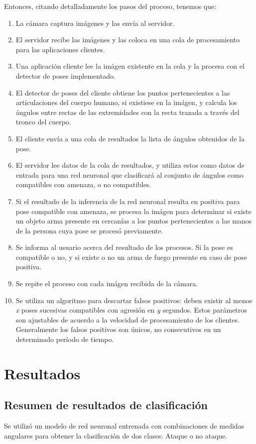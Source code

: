 \documentclass[a4paper,12pt,oneside,spanish]{book}
\begin{document}
Entonces, citando detalladamente los pasos del proceso, tenemos que:
\begin{enumerate}
	\item La cámara captura imágenes y las envía al servidor.
	\item El servidor recibe las imágenes y las coloca en una cola de procesamiento para las aplicaciones clientes.
	\item Una aplicación cliente lee la imágen existente en la cola y la procesa con el detector de poses implementado.
	\item El detector de poses del cliente obtiene los puntos pertenecientes a las articulaciones del cuerpo humano, si existiese en la imágen, y calcula los ángulos entre rectas de las extremidades con la recta trazada a través del tronco del cuerpo.
	\item El cliente envía a una cola de resultados la lista de ángulos obtenidos de la pose.
	\item El servidor lee datos de la cola de resultados, y utiliza estos como datos de entrada para una red neuronal que clasificará al conjunto de ángulos como compatibles con amenaza, o no compatibles.
	\item Si el resultado de la inferencia de la red neuronal resulta en positiva para pose compatible con amenaza, se procesa la imágen para determinar si existe un objeto arma presente en cercanías a los puntos pertenecientes a las manos de la persona cuya pose se procesó previamente.
	\item Se informa al usuario acerca del resultado de los procesos. Si la pose es compatible o no, y si existe o no un arma de fuego presente en caso de pose positiva.
	\item Se repite el proceso con cada imágen recibida de la cámara.
	\item Se utiliza un algoritmo para descartar falsos positivos: deben existir al menos \textit{x} poses sucesivas compatibles con agresión en \textit{y} segundos. Estos parámetros son ajustables de acuerdo a la velocidad de procesamiento de los clientes. Generalmente los falsos positivos son únicos, no consecutivos en un determinado período de tiempo.
\end{enumerate}\par

\newpage
\chapter{Resultados}
\section{Resumen de resultados de clasificación}\label{results1}
Se utilizó un modelo de red neuronal entrenada con combinaciones de medidas angulares para obtener la clasificación de dos clases: Ataque o no ataque. 
\end{document}
